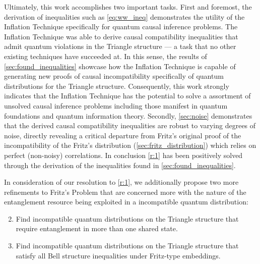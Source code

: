 \documentclass[aps, 10pt, english, twoside, pra, nofootinbib, tightenlines, longbibliography, superscriptaddress]{revtex4-1}
\begin{document}
    Ultimately, this work accomplishes two important tasks. First and foremost, the derivation of inequalities such as \cref{eq:ww_ineq} demonstrates the utility of the Inflation Technique specifically for quantum causal inference problems. The Inflation Technique was able to derive causal compatibility inequalities that admit quantum violations in the Triangle structure --- a task that no other existing techniques have succeeded at. In this sense, the results of \cref{sec:found_inequalities} showcase how the Inflation Technique is capable of generating new proofs of causal incompatibility specifically of quantum distributions for the Triangle structure. Consequently, this work strongly indicates that the Inflation Technique has the potential to solve a assortment of unsolved causal inference problems including those manifest in quantum foundations and quantum information theory. Secondly, \cref{sec:noise} demonstrates that the derived causal compatibility inequalities are robust to varying degrees of noise, directly revealing a critical departure from Fritz's original proof of the incompatibility of the Fritz's distribution (\cref{sec:fritz_distribution}) which relies on perfect (non-noisy) correlations. In conclusion \ref{r:1} has been positively solved through the derivation of the inequalities found in \cref{sec:found_inequalities}.

    In consideration of our resolution to \ref{r:1}, we additionally propose two more refinements to Fritz's Problem that are concerned more with the nature of the entanglement resource being exploited in a incompatible quantum distribution:
    \begin{enumerate}[label=\textbf{R.\arabic*}]
        \setcounter{enumi}{1}
        \item \label{r:2} Find incompatible quantum distributions on the Triangle structure that require entanglement in more than one shared state.
        \item \label{r:3} Find incompatible quantum distributions on the Triangle structure that satisfy all Bell structure inequalities under Fritz-type embeddings.
    \end{enumerate}
\end{document}
